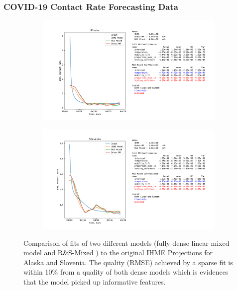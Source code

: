 \documentclass[11pt,letterpaper]{article}
\newcommand{\ouralgo}{R\&S-Mixed }
\numberwithin{equation}{section} %
\numberwithin{figure}{section} %
\numberwithin{table}{section} %
\begin{document}
\subsubsection{COVID-19 Contact Rate Forecasting Data}
\label{ch:covid}
\begin{figure}
	\begin{subfigure}[b]{\textwidth}
		\includegraphics[width=\textwidth]{Images/fit_Alaska}
	\end{subfigure}
	\begin{subfigure}[b]{\textwidth}
		\includegraphics[width=\textwidth]{Images/fit_Slovenia}	
	\end{subfigure}
	\caption{\label{fig:covid_feature_selection_1} Comparison of fits of two different models (fully dense linear mixed model and \ouralgo) to the original IHME Projections for Alaska and Slovenia. The quality (RMSE) achieved by a sparse fit is within 10\% from a quality of both dense models which is evidences that the model picked up informative features.}
\end{figure}
\end{document}

